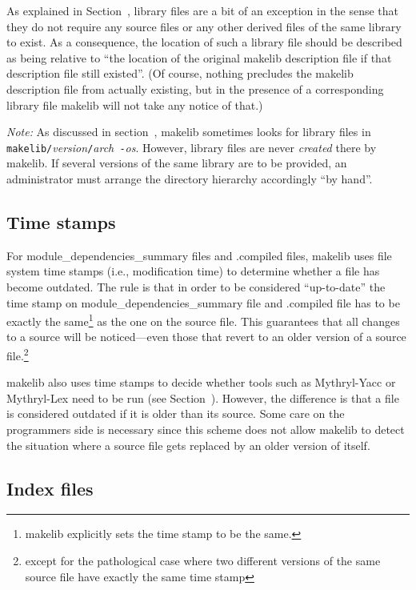 As explained in Section~, library files are a bit of
an exception in the sense that they do not require any source files or
any other derived files of the same library to exist.  As a
consequence, the location of such a library file should be described
as being relative to ``the location of the original makelib description
file if that description file still existed''.  (Of course, nothing
precludes the makelib description file from actually existing, but in the
presence of a corresponding library file makelib will not take any notice
of that.)

{\em Note:} As discussed in section~, makelib sometimes
looks for library files in {\tt makelib/}{\it version}{\tt /}{\it arch}{\tt
-}{\it os}.  However, library files are never {\em created} there by
makelib.  If several versions of the same library are to be provided, an
administrator must arrange the directory hierarchy accordingly ``by
hand''.

\subsection{Time stamps}

For module_dependencies_summary files and .compiled files, makelib uses file system time stamps
(i.e., modification time) to determine whether a file has become
outdated.  The rule is that in order to be considered ``up-to-date''
the time stamp on module_dependencies_summary file and .compiled file has to be exactly the
same\footnote{makelib explicitly sets the time stamp to be the same.} as
the one on the source file.  This guarantees that all changes to a
source will be noticed---even those that revert to an older version of
a source file.\footnote{except for the pathological case where two
different versions of the same source file have exactly the same time
stamp}

makelib also uses time stamps to decide whether tools such as Mythryl-Yacc or
Mythryl-Lex need to be run (see Section~).  However, the
difference is that a file is considered outdated if it is older than
its source.  Some care on the programmers side is necessary since this
scheme does not allow makelib to detect the situation where a source file
gets replaced by an older version of itself.

\subsection{Index files}
\label{sec:indexfiles}

